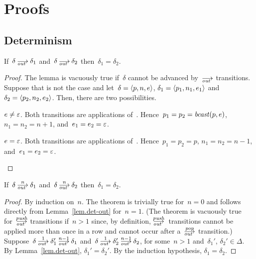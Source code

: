 \appendix
\section{Proofs}
\label{sec.proofs}

\subsection*{Determinism}


\begin{lemma}\label{lem.det-out}
  If~$\delta\out\delta_1$ and~$\delta\out\delta_2$ then~$\delta_1=\delta_2$.
\end{lemma}
\begin{proof}
  The lemma is vacuously true if~$\delta$ cannot be advanced by~$\out$
  transitions.  Suppose that is not the case and let~$\delta=\<p,n,e>$,
  $\delta_1=\<p_1,n_1,e_1>$ and~$\delta_2=\<p_2,n_2,e_2>$.  Then, there are
  two possibilities.
  \begin{case}
    $e\ne\varepsilon$.  Both transitions are applications of~.
    Hence~$p_1=p_2=\operatorname{\mathit{bcast}}(p,e)$, $n_1=n_2=n+1$, and~$e_1=e_2=\varepsilon$.
  \end{case}
  \begin{case}
    $e=\varepsilon$.  Both transitions are applications of~.
    Hence~$p_1=p_2=p$, $n_1=n_2=n-1$, and~$e_1=e_2=\varepsilon$.\qedhere
  \end{case}
\end{proof}


\begin{theorem}\label{thm.det-out-pop-n}
  If~$\delta\out[n]\delta_1$ and~$\delta\out[n]\delta_2$
  then~$\delta_1=\delta_2$.
\end{theorem}
\begin{proof}
  By induction on~$n$.
  The theorem is trivially true for~$n=0$ and follows directly from
  Lemma~\ref{lem.det-out} for~$n=1$.  (The theorem is vacuously true
  for~$\outpush$ transitions if~$n>1$ since, by definition,
  $\outpush$~transitions cannot be applied more than once in a row and
  cannot occur after a~$\outpop$ transition.)
  Suppose~$\delta\out[1]\delta_1'\out[n-1]\delta_1$
  and~$\delta\out[1]\delta_2'\out[n-1]\delta_2$, for some~$n>1$
  and~$\delta_1'$, $\delta_2'\in\Delta$.
  By Lemma~\ref{lem.det-out}, $\delta_1'=\delta_2'$.  By the induction
  hypothesis, $\delta_1=\delta_2$.\qedhere
\end{proof}

